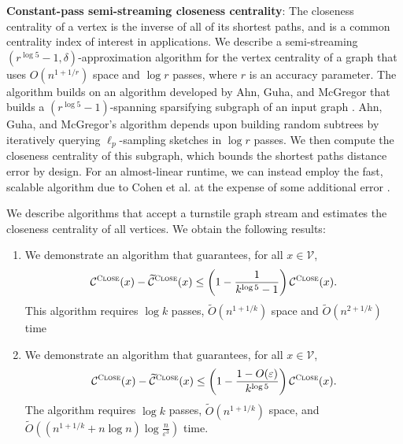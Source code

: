 \documentclass[10]{report}
\newcommand{\algoname}[1]{\textnormal{\textsc{#1}}}
\begin{document}
\noindent
\textbf{Constant-pass semi-streaming closeness centrality}:
The closeness centrality of a vertex is the inverse of all of its shortest paths, and is a common centrality index of interest in applications.
We describe a semi-streaming $(r^{\log 5} -1, \delta)$-approximation algorithm for the vertex centrality of a graph that uses $O(n^{1+1/r})$ space and $\log r$ passes, where $r$ is an accuracy parameter.
The algorithm builds on an algorithm developed by Ahn, Guha, and McGregor that builds a $(r^{\log 5} -1)$-spanning sparsifying subgraph of an input graph \cite{ahn2012graph}.
Ahn, Guha, and McGregor's algorithm depends upon building random subtrees by iteratively querying $\ell_p$-sampling sketches in $\log r$ passes.
We then compute the closeness centrality of this subgraph, which bounds the shortest paths distance error by design.
For an almost-linear runtime, we can instead employ the fast, scalable algorithm due to Cohen et al. at the expense of some additional error \cite{cohen2014computing}. 

We describe algorithms that accept a turnstile graph stream and estimates the closeness centrality of all vertices.
We obtain the following results:
\begin{enumerate}
	\item We demonstrate an algorithm that guarantees, for all $x \in \mathcal{V}$,  
%
\begin{equation*}
\mathcal{C}^{\algoname{Close}}(x) - \widetilde{\mathcal{C}}^{\algoname{Close}}(x) \leq \left ( 1 - \frac{1}{k^{\log 5} - 1} \right ) \mathcal{C}^{\algoname{Close}}(x).
\end{equation*}
%
	This algorithm requires $\log k$ passes, $\widetilde{O}(n^{1 + 1/k})$ space and $\widetilde{O}(n^{2 + 1/k})$ time
	\item We demonstrate an algorithm that guarantees, for all $x \in \mathcal{V}$, 
%
\begin{equation*}
\mathcal{C}^{\algoname{Close}}(x) - \widetilde{\mathcal{C}}^{\algoname{Close}}(x) \leq \left ( 1 - \frac{1 - O(\varepsilon)}{k^{\log 5}} \right ) \mathcal{C}^{\algoname{Close}}(x).
\end{equation*}
%
The algorithm requires $\log k$ passes, $\widetilde{O}(n^{1 + 1/k})$ space, and $\widetilde{O} \left ( \left (n^{1 + 1/k} + n \log n \right )\log \frac{n}{\varepsilon^3} \right )$ time.
\end{enumerate}




\end{document}
